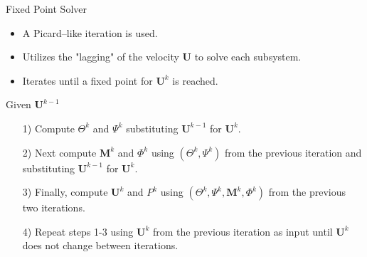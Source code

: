 \documentclass[9pt]{beamer}
\begin{document}
\begin{frame}{Fixed Point Solver}
	\begin{itemize}
		\item A Picard--like iteration is used.
		\item Utilizes the "lagging" of the velocity $\mathbf{U}$ to solve each subsystem.
		\item Iterates until a fixed point for $\mathbf{U}^k$ is reached.
	\end{itemize}
	\vspace{.2in}
	Given $\mathbf{U}^{k-1}$ 
	\begin{itemize}
		\item[1)] Compute $\Theta^k$ and $\Psi^k$ substituting $\mathbf{U}^{k-1}$ for $\mathbf{U}^{k}$.
		
		\item[2)] Next compute $\mathbf{M}^k$ and $\Phi^k$ using $(\Theta^k,\Psi^k)$ from the previous iteration and substituting $\mathbf{U}^{k-1}$ for $\mathbf{U}^{k}$.
		
		\item[3)] Finally, compute $\mathbf{U}^k$ and $P^k$ using $(\Theta^k,\Psi^k, \mathbf{M}^k, \Phi^k)$ from the previous two iterations.
		
		\item[4)] Repeat steps 1-3 using $\mathbf{U}^k$ from the previous iteration as input until $\mathbf{U}^k$ does not change between iterations.
	\end{itemize}
\end{frame}
\end{document}
